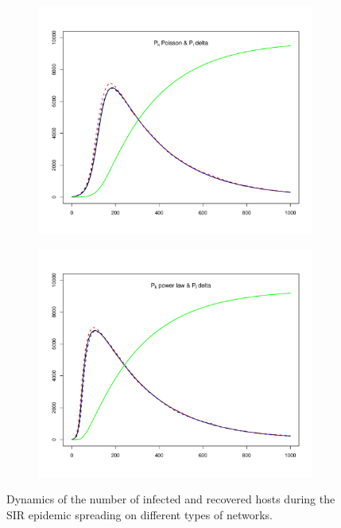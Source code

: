 \begin{figure}[hbtp]
\begin{subfigure}[b]{0.45\textwidth}
    \end{subfigure}
    \newline
    \begin{subfigure}[b]{0.45\textwidth}
        \centering
        \includegraphics[width=\textwidth, trim=30 20 30 20, clip]{../img/sir_02.pdf}
    \end{subfigure}
    \hspace{0.08\textwidth}
    \begin{subfigure}[b]{0.45\textwidth}
        \centering
        \includegraphics[width=\textwidth, trim=30 20 30 20, clip]{../img/sir_12.pdf}
    \end{subfigure}
    \newline
    \caption{Dynamics of the number of infected and recovered hosts during the SIR epidemic spreading on different types of networks.}
    \label{fig:sir_plots}
\end{figure}

